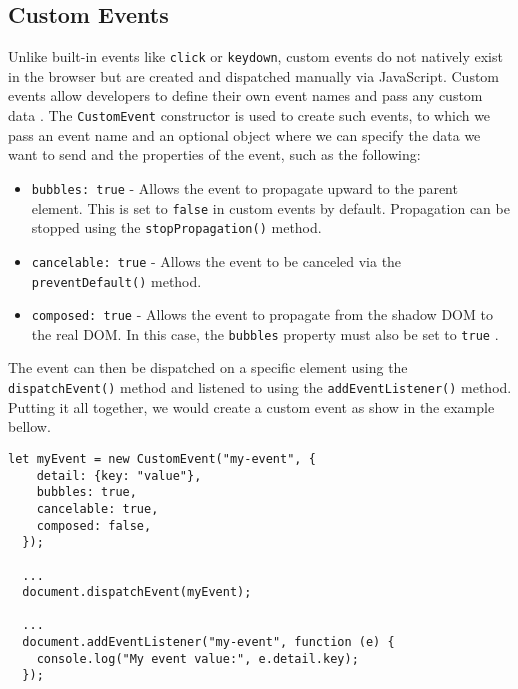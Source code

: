 \subsection{Custom Events}
Unlike built-in events like \texttt{click} or \texttt{keydown}, custom events do not natively exist in the browser but are created and dispatched manually via JavaScript. Custom events allow developers to define their own event names and pass any custom data \cite{MDNCustomEvent}. The \texttt{CustomEvent} constructor is used to create such events, to which we pass an event name and an optional object where we can specify the data we want to send and the properties of the event, such as the following:
\begin{itemize}
    \item \texttt{bubbles: true} - Allows the event to propagate upward to the parent element. This is set to \texttt{false} in custom events by default. Propagation can be stopped using the \texttt{stopPropagation()} method.
    \item \texttt{cancelable: true} - Allows the event to be canceled via the \texttt{preventDefault()} method.
    \item \texttt{composed: true} - Allows the event to propagate from the shadow DOM to the real DOM. In this case, the \texttt{bubbles} property must also be set to \texttt{true} \cite{JamesCustomEvent}.
\end{itemize}
The event can then be dispatched on a specific element using the \texttt{dispatchEvent()} method and listened to using the \texttt{addEventListener()} method. Putting it all together, we would create a custom event as show in the example bellow.
\begin{lstlisting}[caption={Example of creating and handling custom events}]
  let myEvent = new CustomEvent("my-event", {
    detail: {key: "value"},
    bubbles: true,
    cancelable: true,
    composed: false,
  });

  ...
  document.dispatchEvent(myEvent);

  ...
  document.addEventListener("my-event", function (e) {
    console.log("My event value:", e.detail.key);
  });
\end{lstlisting}